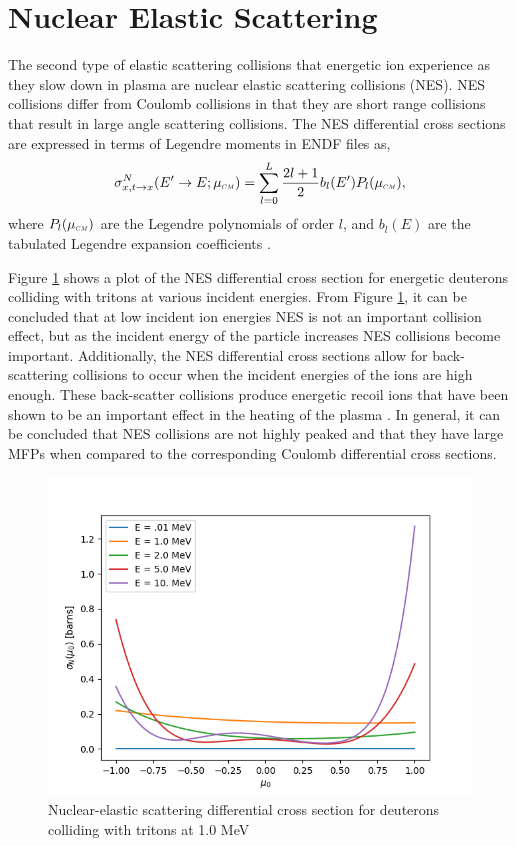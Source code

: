 \section{Nuclear Elastic Scattering}
The second type of elastic scattering collisions that energetic ion experience as they slow down in plasma are nuclear elastic scattering collisions (NES). NES collisions differ from Coulomb collisions in that they are short range collisions that result in large angle scattering collisions. The NES differential cross sections are expressed in terms of Legendre moments in ENDF files as,
\begin{equation} \label{eqn:nes_differential cross section}
    \sigma_{x,t \rightarrow x}^N(E^{\prime} \rightarrow E; \mucm) = \sum_{l=0}^L \dfrac{2l+1}{2} b_l(E^{\prime}) P_l(\mucm),
\end{equation}
where $P_l(\mucm)$ are the Legendre polynomials of order $l$, and $b_l(E)$ are the tabulated Legendre expansion coefficients \cite{Brown-2018}.

Figure \ref{fig:sig_n} shows a plot of the NES differential cross section for energetic deuterons colliding with tritons at various incident energies. From Figure \ref{fig:sig_n}, it can be concluded that at low incident ion energies NES is not an important collision effect, but as the incident energy of the particle increases NES collisions become important. Additionally, the NES differential cross sections allow for back-scattering collisions to occur when the incident energies of the ions are high enough. These back-scatter collisions produce energetic recoil ions that have been shown to be an important effect in the heating of the plasma \cite{Nakao-1988}. In general, it can be concluded that NES collisions are not highly peaked and that they have large MFPs when compared to the corresponding Coulomb differential cross sections.

\begin{figure}[!htb]
    \centering
    \includegraphics[scale=0.75]{../figures/proposed_work/sig_n_dt.png}
    \caption{Nuclear-elastic scattering differential cross section for deuterons colliding with tritons at 1.0 MeV}
    \label{fig:sig_n}
\end{figure}



